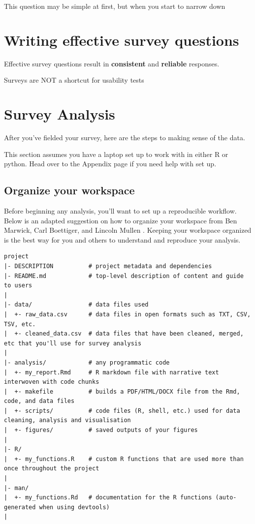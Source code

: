 \documentclass[]{book}
\begin{document}
This question may be simple at first, but when you start to narrow down

\hypertarget{writing-effective-survey-questions}{%
\chapter{Writing effective survey questions}\label{writing-effective-survey-questions}}

Effective survey questions result in \textbf{consistent} and \textbf{reliable} responses.

Surveys are NOT a shortcut for usability tests

\hypertarget{analysis}{%
\chapter{Survey Analysis}\label{analysis}}

After you've fielded your survey, here are the steps to making sense of the data.

This section assumes you have a laptop set up to work with in either R or python. Head over to the Appendix page if you need help with set up.

\hypertarget{organize-your-workspace}{%
\section{Organize your workspace}\label{organize-your-workspace}}

Before beginning any analysis, you'll want to set up a reproducible workflow. Below is an adapted suggestion on how to organize your workspace from Ben Marwick, Carl Boettiger, and Lincoln Mullen \citep{reproducible_workflow}. Keeping your workspace organized is the best way for you and others to understand and reproduce your analysis.

\begin{verbatim}
project
|- DESCRIPTION          # project metadata and dependencies 
|- README.md            # top-level description of content and guide to users
|
|- data/                # data files used 
|  +- raw_data.csv      # data files in open formats such as TXT, CSV, TSV, etc.
|  +- cleaned_data.csv  # data files that have been cleaned, merged, etc that you'll use for survey analysis
|
|- analysis/            # any programmatic code
|  +- my_report.Rmd     # R markdown file with narrative text interwoven with code chunks 
|  +- makefile          # builds a PDF/HTML/DOCX file from the Rmd, code, and data files
|  +- scripts/          # code files (R, shell, etc.) used for data cleaning, analysis and visualisation
|  +- figures/          # saved outputs of your figures
|
|- R/                     
|  +- my_functions.R    # custom R functions that are used more than once throughout the project
|
|- man/
|  +- my_functions.Rd   # documentation for the R functions (auto-generated when using devtools)
|
\end{verbatim}
\end{document}
